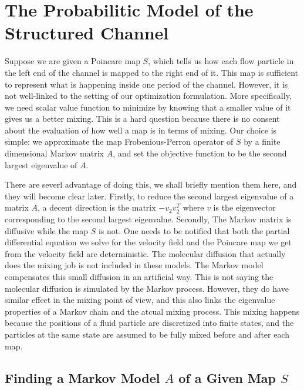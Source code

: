 \documentclass{article}
\begin{document}
 
\section{The Probabilitic Model of the Structured Channel}
Suppose we are given a Poincare map $S$, which tells us how each flow particle in the left end of the channel is mapped to the right end of it. This map is sufficient to represent what is happening inside one period of the channel. However, it is not well-linked to the setting of our optimization formulation. More specifically, we need scalar value function to minimize by knowing that a smaller value of it gives us a better mixing. This is a hard question because there is no consent about the evaluation of how well a map is in terms of mixing. Our choice is simple: we approximate the map Frobenious-Perron operator of $S$ by a finite dimensional Markov matrix $A$, and set the objective function to be the second largest eigenvalue of $A$.   

There are severl advantage of doing this, we shall briefly mention them here, and they will become clear later. Firstly, to reduce the second largest eigenvalue of a matrix $A$, a decent direction is the matrix $-v_2 v_2^T$ where $v$ is the eigenvector corresponding to the second largest eigenvalue. Secondly, The Markov matrix is diffusive while the map $S$ is not. One needs to be notified that both the partial differential equation we solve for the velocity field and the Poincare map we get from the velocity field are deterministic. The molecular diffusion that actually does the mixing job is not included in these models. The Markov model compensates this small diffusion in an artificial way. This is not saying the molecular diffusion is simulated by the Markov process. However, they do have similar effect in the mixing point of view, and this also links the eigenvalue properties of a Markov chain and the atcual mixing process. This mixing happens because the positions of a fluid particle are discretized into finite states, and the particles at the same state are assumed to be fully mixed before and after each map.


\subsection{Finding a Markov Model $A$ of a Given Map $S$}
\end{document}
